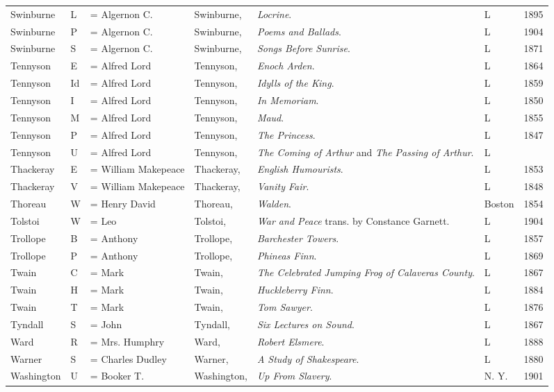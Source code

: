 \begin{sidewaystable}
\centering\small
\begin{tabular}{p{} p{} p{} p{} p{} p{} p{}}
Swinburne & L & = Algernon C. & Swinburne, & \textit{Locrine}. & L & 1895 \\
Swinburne & P & = Algernon C. & Swinburne, & \textit{Poems and Ballads}. & L & 1904 \\
Swinburne & S & = Algernon C. & Swinburne, & \textit{Songs Before Sunrise}. & L & 1871 \\
Tennyson & E & = Alfred Lord & Tennyson, & \textit{Enoch Arden}. & L & 1864 \\
Tennyson & Id & = Alfred Lord & Tennyson, & \textit{Idylls of the King}. & L & 1859 \\
Tennyson & I & = Alfred Lord & Tennyson, & \textit{In Memoriam}. & L & 1850 \\
Tennyson & M & = Alfred Lord & Tennyson, & \textit{Maud}. & L & 1855 \\
Tennyson & P & = Alfred Lord & Tennyson, & \textit{The Princess}. & L & 1847 \\
Tennyson & U & = Alfred Lord & Tennyson, & \textit{The Coming of Arthur} and \textit{The Passing of Arthur}. & L & \\
Thackeray & E & = William Makepeace & Thackeray, & \textit{English Humourists}. & L & 1853 \\
Thackeray & V & = William Makepeace & Thackeray, & \textit{Vanity Fair}. & L & 1848 \\
Thoreau & W & = Henry David & Thoreau, & \textit{Walden}. & Boston & 1854 \\
Tolstoi & W & = Leo & Tolstoi, & \textit{War and Peace} trans. by Constance Garnett. & L & 1904 \\
Trollope & B & = Anthony & Trollope, & \textit{Barchester Towers}. & L & 1857 \\
Trollope & P & = Anthony & Trollope, & \textit{Phineas Finn}. & L & 1869 \\
Twain & C & = Mark & Twain, & \textit{The Celebrated Jumping Frog of Calaveras County}. & L & 1867 \\
Twain & H & = Mark & Twain, & \textit{Huckleberry Finn}. & L & 1884 \\
Twain & T & = Mark & Twain, & \textit{Tom Sawyer}. & L & 1876 \\
Tyndall & S & = John & Tyndall, & \textit{Six Lectures on Sound}. & L & 1867 \\
Ward & R & = Mrs. Humphry & Ward, & \textit{Robert Elsmere}. & L & 1888 \\
Warner & S & = Charles Dudley & Warner, & \textit{A Study of Shakespeare}. & L & 1880 \\
Washington & U & = Booker T. & Washington, & \textit{Up From Slavery}. & N. Y. & 1901 \\
\end{tabular}
\end{sidewaystable}

